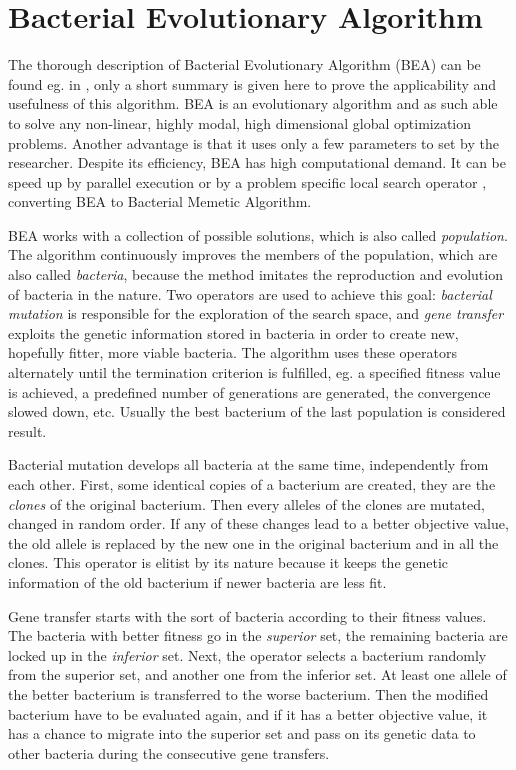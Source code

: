 \documentclass[graybox]{svmult}
\begin{document}
\section{Bacterial Evolutionary Algorithm}
\label{sec:bea}

The thorough description of Bacterial Evolutionary Algorithm (BEA) 
can be found eg. in \cite
{nawa1997study,nawa1998study,nawa1998bacterial,nawa1999fuzzy}, only 
a short summary is given here to prove the applicability and 
usefulness of this algorithm. BEA is an evolutionary algorithm and 
as such able to solve any non-linear, highly modal, high dimensional 
global optimization problems. Another advantage is that it uses only 
a few parameters to set by the researcher. Despite its efficiency, 
BEA has high computational demand. It can be speed up by parallel 
execution \cite{hatwagner2011parallel} or by a problem specific 
local search operator \cite{koczy2018enhanced}, converting BEA to 
Bacterial Memetic Algorithm.

BEA works with a collection of possible solutions, which is also called 
\emph{population}. The algorithm continuously improves the members of 
the population, which are also called \emph{bacteria}, because the 
method imitates the reproduction and evolution of bacteria in the 
nature. Two operators are used to achieve this goal: \emph{bacterial 
mutation} is responsible for the exploration of the search space, and 
\emph{gene transfer} exploits the genetic information stored in 
bacteria in order to create new, hopefully fitter, more viable 
bacteria. The algorithm uses these operators alternately until the 
termination criterion is fulfilled, eg. a specified fitness value is 
achieved, a predefined number of generations are generated, the 
convergence slowed down, etc. Usually the best bacterium of the 
last population is considered result.

Bacterial mutation develops all bacteria at the same time, 
independently from each other. First, some identical copies of a 
bacterium are created, they are the \emph{clones} of the original 
bacterium. Then every alleles of the clones are mutated, changed in 
random order. If any of these changes lead to a better objective 
value, the old allele is replaced by the new one in the original 
bacterium and in all the clones. This operator is elitist by its 
nature because it keeps the genetic information of the old bacterium 
if newer bacteria are less fit.

Gene transfer starts with the sort of bacteria according to their 
fitness values. The bacteria with better fitness go in the 
\emph{superior} set, the remaining bacteria are locked up in the 
\emph{inferior} set. Next, the operator selects a bacterium randomly 
from the superior set, and another one from the inferior set. At least 
one allele of the better bacterium is transferred to the worse 
bacterium. Then the modified bacterium have to be evaluated again, and 
if it has a better objective value, it has a chance to migrate into 
the superior set and pass on its genetic data to other bacteria during 
the consecutive gene transfers.
\end{document}
